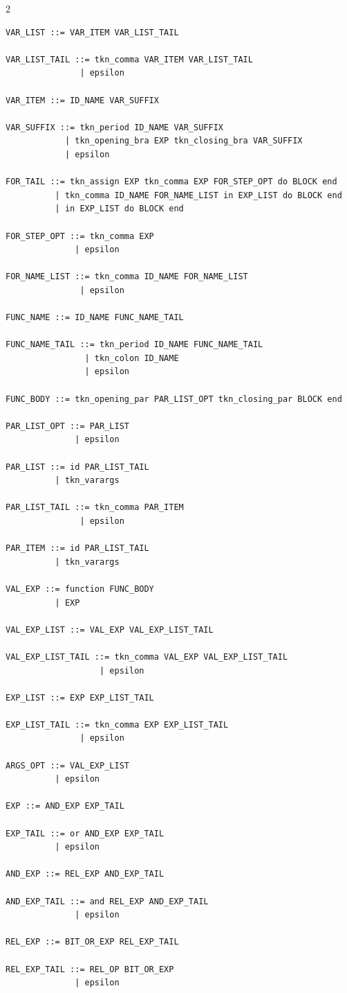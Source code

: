 \documentclass[10pt,letterpaper]{article}
\begin{document}
\begin{multicols}{2}
\begin{lstlisting}[style=grammarstyle]
VAR_LIST ::= VAR_ITEM VAR_LIST_TAIL

VAR_LIST_TAIL ::= tkn_comma VAR_ITEM VAR_LIST_TAIL
               | epsilon

VAR_ITEM ::= ID_NAME VAR_SUFFIX

VAR_SUFFIX ::= tkn_period ID_NAME VAR_SUFFIX
            | tkn_opening_bra EXP tkn_closing_bra VAR_SUFFIX
            | epsilon

FOR_TAIL ::= tkn_assign EXP tkn_comma EXP FOR_STEP_OPT do BLOCK end
          | tkn_comma ID_NAME FOR_NAME_LIST in EXP_LIST do BLOCK end
          | in EXP_LIST do BLOCK end

FOR_STEP_OPT ::= tkn_comma EXP
              | epsilon

FOR_NAME_LIST ::= tkn_comma ID_NAME FOR_NAME_LIST
               | epsilon

FUNC_NAME ::= ID_NAME FUNC_NAME_TAIL

FUNC_NAME_TAIL ::= tkn_period ID_NAME FUNC_NAME_TAIL
                | tkn_colon ID_NAME
                | epsilon

FUNC_BODY ::= tkn_opening_par PAR_LIST_OPT tkn_closing_par BLOCK end

PAR_LIST_OPT ::= PAR_LIST
              | epsilon

PAR_LIST ::= id PAR_LIST_TAIL
          | tkn_varargs

PAR_LIST_TAIL ::= tkn_comma PAR_ITEM
               | epsilon

PAR_ITEM ::= id PAR_LIST_TAIL
          | tkn_varargs

VAL_EXP ::= function FUNC_BODY
          | EXP

VAL_EXP_LIST ::= VAL_EXP VAL_EXP_LIST_TAIL

VAL_EXP_LIST_TAIL ::= tkn_comma VAL_EXP VAL_EXP_LIST_TAIL
                   | epsilon

EXP_LIST ::= EXP EXP_LIST_TAIL

EXP_LIST_TAIL ::= tkn_comma EXP EXP_LIST_TAIL
               | epsilon

ARGS_OPT ::= VAL_EXP_LIST
          | epsilon

EXP ::= AND_EXP EXP_TAIL

EXP_TAIL ::= or AND_EXP EXP_TAIL
          | epsilon

AND_EXP ::= REL_EXP AND_EXP_TAIL

AND_EXP_TAIL ::= and REL_EXP AND_EXP_TAIL
              | epsilon

REL_EXP ::= BIT_OR_EXP REL_EXP_TAIL

REL_EXP_TAIL ::= REL_OP BIT_OR_EXP
              | epsilon


\end{lstlisting}
\end{multicols}
\end{document}

